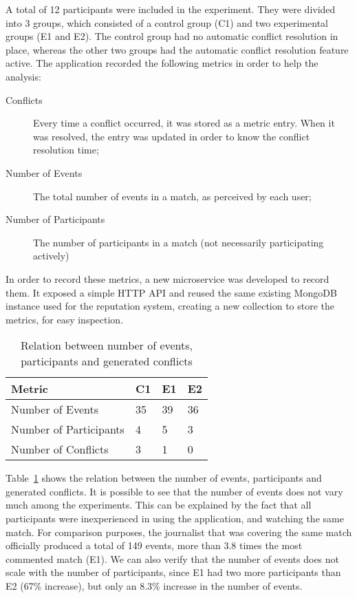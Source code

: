 A total of 12 participants were included in the experiment. They were divided into 3 groups, which consisted of a control group (C1) and two experimental groups (E1 and E2). The control group had no automatic conflict resolution in place, whereas the other two groups had the automatic conflict resolution feature active. The application recorded the following metrics in order to help the analysis:

\begin{description}
    \item[Conflicts] Every time a conflict occurred, it was stored as a metric entry. When it was resolved, the entry was updated in order to know the conflict resolution time;
    \item[Number of Events] The total number of events in a match, as perceived by each user;
    \item[Number of Participants] The number of participants in a match (not necessarily participating actively)
\end{description}

In order to record these metrics, a new microservice was developed to record them. It exposed a simple HTTP API and reused the same existing MongoDB instance used for the reputation system, creating a new collection to store the metrics, for easy inspection.

\begin{table}
    \centering
    \caption{Relation between number of events, participants and generated conflicts}
    \begin{tabular}{|l|l|l|l|}
        \hline
        \textbf{Metric}        & \textbf{C1} & \textbf{E1} & \textbf{E2} \\ \hline \hline
        Number of Events       & 35 & 39 & 36 \\ \hline
        Number of Participants & 4  & 5  & 3  \\ \hline
        Number of Conflicts\footnotemark    & 3  & 1  & 0  \\ \hline
    \end{tabular}
    \label{table:num-events-participants-conflicts}
\end{table}


Table~\ref{table:num-events-participants-conflicts} shows the relation between the number of events, participants and generated conflicts. It is possible to see that the number of events does not vary much among the experiments. This can be explained by the fact that all participants were inexperienced in using the application, and watching the same match. For comparison purposes, the journalist that was covering the same match officially produced a total of 149 events, more than 3.8 times the most commented match (E1). We can also verify that the number of events does not scale with the number of participants, since E1 had two more participants than E2 (67\% increase), but only an 8.3\% increase in the number of events.

